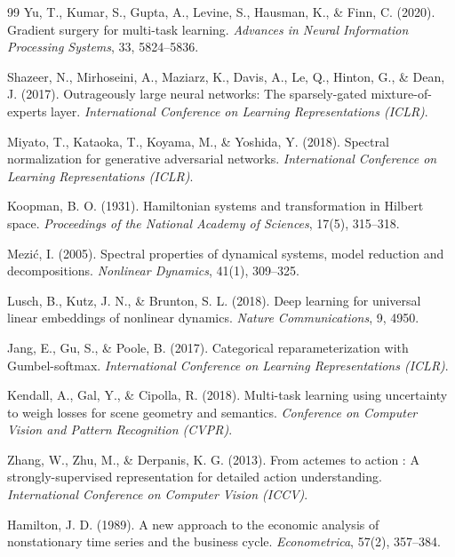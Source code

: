 \documentclass[11pt,a4paper]{article}
\begin{document}
\begin{thebibliography}{99}
Yu, T., Kumar, S., Gupta, A., Levine, S., Hausman, K., \& Finn, C.
(2020). Gradient surgery for multi-task learning.
\emph{Advances in Neural Information Processing Systems}, 33,
5824--5836.

Shazeer, N., Mirhoseini, A., Maziarz, K., Davis, A., Le, Q., Hinton, G.,
\& Dean, J. (2017). Outrageously large neural networks: The
sparsely-gated mixture-of-experts layer.
\emph{International Conference on Learning Representations (ICLR)}.

Miyato, T., Kataoka, T., Koyama, M., \& Yoshida, Y. (2018). Spectral
normalization for generative adversarial networks.
\emph{International Conference on Learning Representations (ICLR)}.

Koopman, B. O. (1931). Hamiltonian systems and transformation in
Hilbert space. \emph{Proceedings of the National Academy of Sciences},
17(5), 315--318.

Mezi\'c, I. (2005). Spectral properties of dynamical systems, model
reduction and decompositions. \emph{Nonlinear Dynamics}, 41(1),
309--325.

Lusch, B., Kutz, J. N., \& Brunton, S. L. (2018). Deep learning for
universal linear embeddings of nonlinear dynamics.
\emph{Nature Communications}, 9, 4950.

Jang, E., Gu, S., \& Poole, B. (2017). Categorical reparameterization
with Gumbel-softmax. \emph{International Conference on Learning
Representations (ICLR)}.

Kendall, A., Gal, Y., \& Cipolla, R. (2018). Multi-task learning using
uncertainty to weigh losses for scene geometry and semantics.
\emph{Conference on Computer Vision and Pattern Recognition (CVPR)}.

Zhang, W., Zhu, M., \& Derpanis, K. G. (2013). From actemes to action :
A strongly-supervised representation for detailed action understanding.
\emph{International Conference on Computer Vision (ICCV)}.

Hamilton, J. D. (1989). A new approach to the economic analysis of
nonstationary time series and the business cycle.
\emph{Econometrica}, 57(2), 357--384.

\end{thebibliography}
\end{document}
